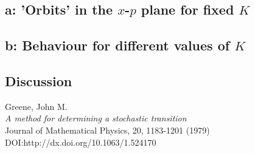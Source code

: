 \documentclass{article}
\begin{document}
\subsection{a: 'Orbits' in the $x$-$p$ plane for fixed $K$}

\subsection{b: Behaviour for different values of $K$}

\subsection{Discussion}


\begin{thebibliography}{1337}
Greene, John M.\\
\emph{A method for determining a stochastic transition}\\
Journal of Mathematical Physics, 20, 1183-1201 (1979)\\ DOI:http://dx.doi.org/10.1063/1.524170

\end{thebibliography}
\end{document}

